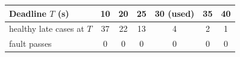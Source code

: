 \begin{tabular}{@{}l c c c c c c@{}}
\hline
\textbf{Deadline $T$ (s)} & \textbf{10} & \textbf{20} & \textbf{25} & \textbf{30 (used)} & \textbf{35} & \textbf{40} \\
\hline
healthy late cases at $T$ & 37 & 22 & 13 & 4 & 2 & 1 \\[1pt]
fault passes & 0 & 0 & 0 & 0 & 0 & 0 \\
\hline
\end{tabular}
